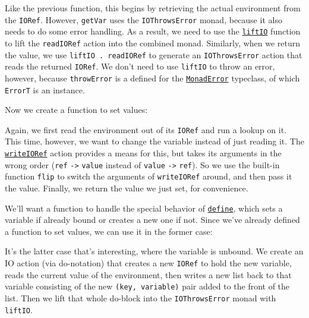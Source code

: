 Like the previous function, this begins by retrieving the actual environment from the \verb|IORef|. However, \verb|getVar| uses the \verb|IOThrowsError| monad, because it also needs to do some error handling. As a result, we need to use the \href{http://www.haskell.org/ghc/docs/6.4/html/libraries/mtl/Control.Monad.Trans.html\#v\%3aliftIO}{\texttt{liftIO}} function to lift the \verb|readIORef| action into the combined monad. Similarly, when we return the value, we use \lstinline|liftIO . readIORef| to generate an \verb|IOThrowsError| action that reads the returned \verb|IORef|. We don't need to use \verb|liftIO| to throw an error, however, because \verb|throwError| is a defined for the \href{http://www.haskell.org/ghc/docs/6.4/html/libraries/mtl/Control.Monad.Error.html\#t\%3aMonadError}{\texttt{MonadError}} typeclass, of which \verb|ErrorT| is an instance.
 
Now we create a function to set values:
 
 
Again, we first read the environment out of its \verb|IORef| and run a lookup on it. This time, however, we want to change the variable instead of just reading it. The \href{http://www.haskell.org/ghc/docs/6.4/html/libraries/base/Data.IORef.html\#v\%3awriteIORef}{\texttt{writeIORef}} action provides a means for this, but takes its arguments in the wrong order (\verb|ref| \lstinline|->| \verb|value| instead of \verb|value| \lstinline|->| \verb|ref|). So we use the built-in function \verb|flip| to switch the arguments of \verb|writeIORef| around, and then pass it the value. Finally, we return the value we just set, for convenience.
 
We'll want a function to handle the special behavior of \href{http://www.schemers.org/Documents/Standards/R5RS/HTML/r5rs-Z-H-8.html\#\%_sec_5.2}{\texttt{define}}, which sets a variable if already bound or creates a new one if not. Since we've already defined a function to set values, we can use it in the former case:
 
 
It's the latter case that's interesting, where the variable is unbound. We create an IO action (via do-notation) that creates a new \verb|IORef| to hold the new variable, reads the current value of the environment, then writes a new list back to that variable consisting of the new \verb|(key, variable)| pair added to the front of the list. Then we lift that whole do-block into the \verb|IOThrowsError| monad with \verb|liftIO|.
 
